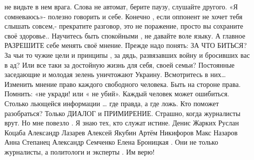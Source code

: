 \begin{multicols}{2}
не видьте в нем врага.
Слова не автомат, берите паузу, слушайте другого.
«Я сомневаюсь»-
полезно говорить и себе.
Конечно , если оппонент не хочет тебя слышать совсем,- прекратите разговор, это не поражение,  просто вы   сохраните своё  здоровье..
Научитесь быть спокойными , не давайте воле языку.
А главное РАЗРЕШИТЕ себе менять своё мнение.
Прежде надо понять: 
ЗА ЧТО БИТЬСЯ? 
За чьи то чужие цели и принципы , за дядь, развязавших войну и бросивших  вас в ад?
Или все таки за достойную жизнь для себя, своей семьи?
 Постоянные заседающие и молодая зелень уничтожают Украину. Всмотритесь в них…
Изменить мнение  право каждого свободного человека.
Быть на стороне права.
Помнить:  «не укради!  
или 
«  не убий».
 Каждый человек может ошибиться.
Столько льющейся информации … 
где правда, а где ложь. 
Кто поможет разобраться? 
Только ДИАЛОГ и ПРИМИРЕНИЕ.
Страшно, когда журналисты  врут. Но мне повезло . 
Я знаю тех, кто служат истине.
Денис Жарких
Руслан Коцаба
Александр Лазарев
Алексей Якубин
 Артём Никифоров
Макс Назаров
 Анна Степанец
Александр Семченко
Елена Броницкая 
 . Они не только журналисты, 
а политологи и эксперты .  
Им верю!
\restorecr
\end{multicols}
